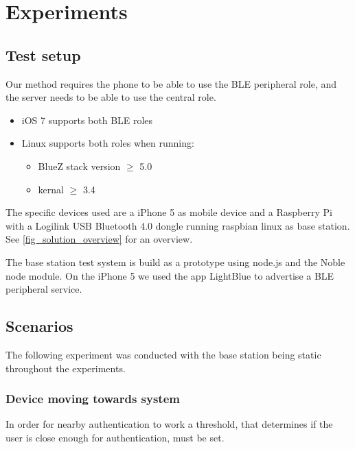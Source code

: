 \section{Experiments}

\subsection{Test setup}

Our method requires the phone to be able to use the BLE peripheral role, and the server needs to be able to use the central role.
\begin{itemize}
	\item iOS 7 supports both BLE roles
	\item Linux supports both roles when running:
	\begin{itemize}
		\item BlueZ stack version $\geq$ 5.0
		\item kernal $\geq$ 3.4 
	\end{itemize}
\end{itemize}
%
The specific devices used are a iPhone 5 as mobile device and a Raspberry Pi with a Logilink USB Bluetooth 4.0 dongle running raspbian linux as base station. See \cref{fig_solution_overview} for an overview.

The base station test system is build as a prototype using node.js and the Noble node module.
On the iPhone 5 we used the app LightBlue to advertise a BLE peripheral service.


\subsection{Scenarios}

The following experiment was conducted with the base station being static throughout the experiments.


\subsubsection{Device moving towards system}
\label{section:MovingTowardsSystem}
In order for nearby authentication to work a threshold, that determines if the user is close enough for authentication, must be set.

